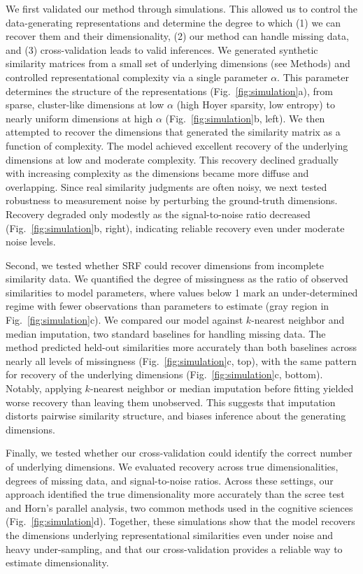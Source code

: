 \documentclass{article}
\begin{document}
We first validated our method through simulations. This allowed us to control the data-generating representations and determine the degree to which (1) we can recover them and their dimensionality, (2) our method can handle missing data, and (3) cross-validation leads to valid inferences. We generated synthetic similarity matrices from a small set of underlying dimensions (see Methods) and controlled representational complexity via a single parameter $\alpha$. This parameter determines the structure of the representations (Fig.~\ref{fig:simulation}a), from sparse, cluster-like dimensions at low $\alpha$ (high Hoyer sparsity, low entropy) to nearly uniform dimensions at high $\alpha$ (Fig.~\ref{fig:simulation}b, left). We then attempted to recover the dimensions that generated the similarity matrix as a function of complexity. The model achieved excellent recovery of the underlying dimensions at low and moderate complexity. This recovery declined gradually with increasing complexity as the dimensions became more diffuse and overlapping. Since real similarity judgments are often noisy, we next tested robustness to measurement noise by perturbing the ground-truth dimensions. Recovery degraded only modestly as the signal-to-noise ratio decreased (Fig.~\ref{fig:simulation}b, right), indicating reliable recovery even under moderate noise levels.

Second, we tested whether SRF could recover dimensions from incomplete similarity data. We quantified the degree of missingness as the ratio of observed similarities to model parameters, where values below 1 mark an under-determined regime with fewer observations than parameters to estimate (gray region in Fig.~\ref{fig:simulation}c). We compared our model against $k$-nearest neighbor and median imputation, two standard baselines for handling missing data. The method predicted held-out similarities more accurately than both baselines across nearly all levels of missingness (Fig.~\ref{fig:simulation}c, top), with the same pattern for recovery of the underlying dimensions (Fig.~\ref{fig:simulation}c, bottom). Notably, applying $k$-nearest neighbor or median imputation before fitting yielded worse recovery than leaving them unobserved. This suggests that imputation distorts pairwise similarity structure, and biases inference about the generating dimensions.

Finally, we tested whether our cross-validation could identify the correct number of underlying dimensions. We evaluated recovery across true dimensionalities, degrees of missing data, and signal-to-noise ratios. Across these settings, our approach identified the true dimensionality more accurately than the scree test and Horn's parallel analysis, two common methods used in the cognitive sciences (Fig.~\ref{fig:simulation}d). Together, these simulations show that the model recovers the dimensions underlying representational similarities even under noise and heavy under-sampling, and that our cross-validation provides a reliable way to estimate dimensionality.
\end{document}
